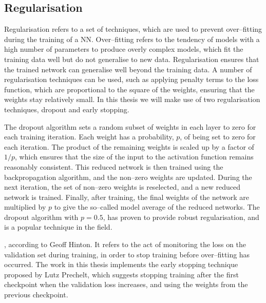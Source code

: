 \subsection{Regularisation}
Regularisation refers to a set of techniques, which are used to prevent
over--fitting during the training of a NN. Over--fitting refers to the tendency
of models with a high number of parameters to produce overly complex models,
which fit the training data well but do not generalise to new data.  
Regularisation ensures that the trained network can generalise well beyond the 
training data. A number of regularisation techniques can be used, such as 
applying penalty terms to the loss function, which are proportional to the 
square of the weights, ensuring that the weights stay relatively small. In 
this thesis we will make use of two regularisation techniques, 
dropout\cite{Srivastava2014DropoutAS} and early 
stopping\cite{OrrGenevieveB.1998NNTo}.

The dropout algorithm sets a random subset of weights in each layer to zero for
each training iteration. Each weight has a probability, $p$, of being set to 
zero for each iteration. The product of the remaining weights is scaled up by 
a factor of $1/p$, which ensures that the size of the input to the activation 
function remains reasonably consistent.  This reduced network is then trained 
using the backpropagation algorithm, and the non--zero weights are updated. 
During the next iteration, the set of non--zero weights is reselected, and a 
new reduced network is trained.  Finally, after training, the final weights of 
the network are multiplied by $p$ to give the so--called model average of the 
reduced networks. The dropout algorithm with $p=0.5$, has proven to provide 
robust regularisation, and is a popular technique in the field\cite{Lecun2015}.

, according to Geoff
Hinton\cite{Hinton2015}. It refers to the act of monitoring the loss on the 
validation set during training, in order to stop training before over--fitting 
has occurred. The work in this thesis implements the early stopping technique 
proposed by Lutz Prechelt\cite{OrrGenevieveB.1998NNTo}, which suggests 
stopping training after the first checkpoint when the validation loss increases,
and using the weights from the previous checkpoint.
